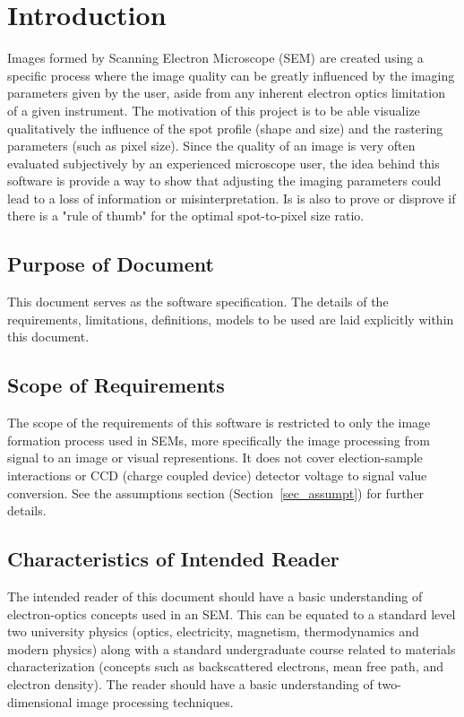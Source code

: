 \documentclass[12pt]{article}
\begin{document}
\section{Introduction}

Images formed by Scanning Electron Microscope (SEM) are created using a 
specific process where the image quality can be greatly influenced by the 
imaging parameters given by the user, aside from any inherent electron 
optics limitation of a given instrument. The motivation of this project is 
to be able visualize qualitatively the influence of the spot profile 
(shape and size) and the rastering parameters (such as pixel size). Since the 
quality of an image is very often evaluated subjectively by an experienced 
microscope user, the idea behind this software is provide a way to show 
that adjusting the imaging parameters could lead to a loss of information 
or misinterpretation. Is is also to prove or disprove if there is a "rule 
of thumb" for the optimal spot-to-pixel size ratio.

\subsection{Purpose of Document}

This document serves as the software specification. The details of the 
requirements, limitations, definitions, models to be used are laid explicitly 
within this document.

\subsection{Scope of Requirements} 

The scope of the requirements of this software is restricted to only the image 
formation process used in SEMs, more specifically the image processing from 
signal to an image or visual representions. It does not cover election-sample 
interactions or CCD (charge coupled device) detector voltage to signal value 
conversion. See the assumptions section (Section~\ref{sec_assumpt}) for further 
details.

\subsection{Characteristics of Intended Reader} \label{sec_IntendedReader}

The intended reader of this document should have a basic understanding of 
electron-optics concepts used in an SEM. This can be equated to a standard level 
two university physics (optics, electricity, magnetism, thermodynamics and 
modern physics) along with a standard undergraduate course related to materials 
characterization (concepts such as backscattered electrons, mean free path, and 
electron density). The reader should have a basic understanding of two-dimensional 
image processing techniques.
\end{document}
